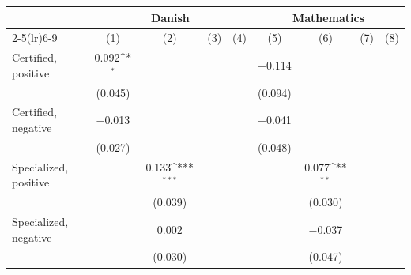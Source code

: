 {
\def\sym#1{\ifmmode^{#1}\else\(^{#1}\)\fi}
\begin{tabular*}{\hsize}{@{\hskip\tabcolsep\extracolsep\fill}l*{8}{c}}
\toprule
                    &\multicolumn{4}{c}{Danish}                                                             &\multicolumn{4}{c}{Mathematics}                                                        \\\cmidrule(lr){2-5}\cmidrule(lr){6-9}
                    &\multicolumn{1}{c}{(1)}         &\multicolumn{1}{c}{(2)}         &\multicolumn{1}{c}{(3)}         &\multicolumn{1}{c}{(4)}         &\multicolumn{1}{c}{(5)}         &\multicolumn{1}{c}{(6)}         &\multicolumn{1}{c}{(7)}         &\multicolumn{1}{c}{(8)}         \\
\midrule
Certified, positive &       0.092\sym{*}  &                     &                     &                     &    $-$0.114         &                     &                     &                     \\
                    &     (0.045)         &                     &                     &                     &     (0.094)         &                     &                     &                     \\
\addlinespace
Certified, negative &    $-$0.013         &                     &                     &                     &    $-$0.041         &                     &                     &                     \\
                    &     (0.027)         &                     &                     &                     &     (0.048)         &                     &                     &                     \\
\addlinespace
Specialized, positive&                     &       0.133\sym{***}&                     &                     &                     &       0.077\sym{**} &                     &                     \\
                    &                     &     (0.039)         &                     &                     &                     &     (0.030)         &                     &                     \\
\addlinespace
Specialized, negative&                     &       0.002         &                     &                     &                     &    $-$0.037         &                     &                     \\
                    &                     &     (0.030)         &                     &                     &                     &     (0.047)         &                     &                     \\

\end{tabular*}}
